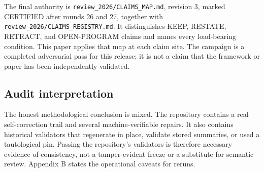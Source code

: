 The final authority is \nolinkurl{review_2026/CLAIMS_MAP.md}, revision 3, marked CERTIFIED after rounds 26
and 27, together with \nolinkurl{review_2026/CLAIMS_REGISTRY.md}. It distinguishes KEEP, RESTATE, RETRACT, and
OPEN-PROGRAM claims and names every load-bearing condition. This
paper applies that map at each claim site. The campaign is a completed adversarial pass for this release; it is not a
claim that the framework or paper has been independently validated.

\subsection{Audit interpretation}

The honest methodological conclusion is mixed. The repository contains a real self-correction trail and several
machine-verifiable repairs. It also contains historical validators that regenerate in place, validate stored summaries,
or used a tautological pin. Passing the repository's validators is therefore necessary evidence of consistency, not a
tamper-evident freeze or a substitute for semantic review. Appendix B states the operational caveats for reruns.
